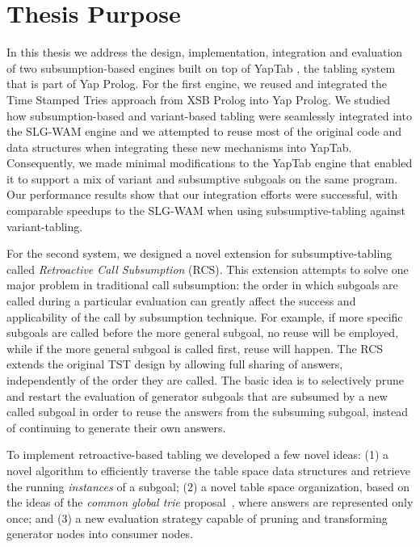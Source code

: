 \section{Thesis Purpose}

In this thesis we address the design, implementation, integration and evaluation of two subsumption-based engines
built on top of YapTab \cite{Rocha-00a}, the tabling system that is part of Yap Prolog. For the first engine, we
reused and integrated the Time Stamped Tries approach from XSB Prolog into Yap Prolog.
We studied how subsumption-based and variant-based tabling were seamlessly
integrated into the SLG-WAM engine and we attempted to reuse most of the original code and data structures when
integrating these new mechanisms into YapTab.  Consequently, we made minimal modifications to the YapTab engine
that enabled it to support a mix of variant and subsumptive subgoals on the same program.
Our performance results show that our integration efforts were successful, with comparable
speedups to the SLG-WAM when using subsumptive-tabling against variant-tabling.

For the second system, we designed a novel extension for subsumptive-tabling called
\emph{Retroactive Call Subsumption} (RCS).
This extension attempts to solve one major problem in traditional call subsumption: the order in
which subgoals are called during a particular evaluation can greatly affect the success and applicability
of the call by subsumption technique. For example, if more specific subgoals are called before
the more general subgoal, no reuse will be employed, while if the more general subgoal is called first,
reuse will happen. The RCS extends the original TST design by allowing full sharing of answers, independently
of the order they are called. The basic idea is to selectively prune and restart the evaluation of generator
subgoals that are subsumed by a new called subgoal in order to reuse the answers from the subsuming subgoal,
instead of continuing to generate their own answers.

To implement retroactive-based tabling we developed a few novel ideas: (1) a novel algorithm to efficiently
traverse the table space data structures and retrieve the running \emph{instances} of a subgoal; (2) a novel table
space organization, based on the ideas of the \emph{common global trie} proposal~\cite{CostaJ-08}, where answers
are represented only once; and (3) a new evaluation strategy capable of pruning and transforming generator nodes
into consumer nodes.

